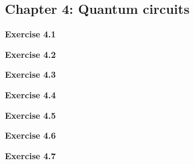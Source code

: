 \documentclass{article}
\begin{document}
\subsection*{Chapter 4: Quantum circuits}


\bigskip

\begin{framed}
    \noindent \textbf{Exercise 4.1}
    
    \medskip
    
    
\end{framed}


\bigskip

\begin{framed}
    \noindent \textbf{Exercise 4.2}
    
    \medskip
    
    
\end{framed}


\bigskip

\begin{framed}
    \noindent \textbf{Exercise 4.3}
    
    \medskip
    
    
\end{framed}


\bigskip

\begin{framed}
    \noindent \textbf{Exercise 4.4}
    
    \medskip
    
    
\end{framed}


\bigskip

\begin{framed}
    \noindent \textbf{Exercise 4.5}
    
    \medskip
    
    
\end{framed}


\bigskip

\begin{framed}
    \noindent \textbf{Exercise 4.6}
    
    \medskip
    
    
\end{framed}


\bigskip

\begin{framed}
    \noindent \textbf{Exercise 4.7}
    
    \medskip
    
    
\end{framed}
\end{document}
